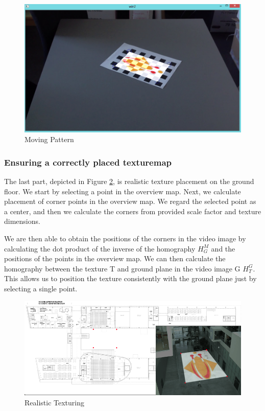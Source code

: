 \begin{figure}[h!]
	\centering
	\includegraphics[width=\textwidth]{final/images/linearmapping2.jpg}
	\caption{Moving Pattern}
	\label{fig:movingpattern}
\end{figure}

\subsubsection{Ensuring a correctly placed texturemap}

The last part, depicted in Figure \ref{fig:realistictexturing}, is realistic texture placement on the ground floor. We start by selecting a point in the overview map. Next, we calculate placement of corner points in the overview map. We regard the selected point as a center, and then we calculate the corners from provided scale factor and texture dimensions.

We are then able to obtain the positions of the corners in the video image by calculating the dot product of the inverse of the homography $H_{G}^{M}$ and the positions of the points in the overview map. We can then calculate the homography between the texture T and ground plane in the video image G $H_{T}^{G}$. This allows us to position the texture consistently with the ground plane just by selecting a single point.

\begin{figure}[h!]
	\centering
	\includegraphics[width=\textwidth]{final/images/realistictexturing.png}
	\caption{Realistic Texturing}
	\label{fig:realistictexturing}
\end{figure}

